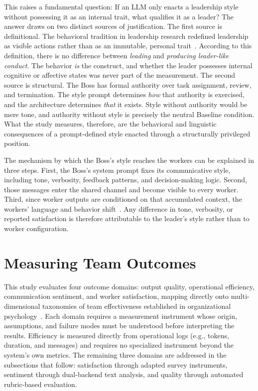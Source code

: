 This raises a fundamental question: 
If an \ac{LLM} only enacts a leadership style without possessing it as an internal trait, what qualifies it as a leader?
The answer draws on two distinct sources of justification.
The first source is definitional.
The behavioral tradition in leadership research redefined leadership as visible actions rather than as an immutable, personal trait~\cite{lewin1939patterns, judge2002personality, mathieu2017teamwork}.
According to this definition, there is no difference between \emph{leading} and \emph{producing leader-like conduct}.
The behavior \textit{is} the construct, and whether the leader possesses internal cognitive or affective states was never part of the measurement.
The second source is structural.
The Boss has formal authority over task assignment, review, and termination.
The style prompt determines \textit{how} that authority is exercised, and the architecture determines \textit{that} it exists.
Style without authority would be mere tone, and authority without style is precisely the neutral Baseline condition.
What the study measures, therefore, are the behavioral and linguistic consequences of a prompt-defined style enacted through a structurally privileged position.

The mechanism by which the Boss's style reaches the workers can be explained in three steps.
First, the Boss's system prompt fixes its communicative style, including tone, verbosity, feedback patterns, and decision-making logic.
Second, those messages enter the shared channel and become visible to every worker.
Third, since worker outputs are conditioned on that accumulated context, the workers' language and behavior shift~\cite{shanahan2023roleplaylargelanguagemodels, lin2025simulatingsocialinfluencedynamics}.
Any difference in tone, verbosity, or reported satisfaction is therefore attributable to the leader's style rather than to worker configuration.

\section{Measuring Team Outcomes}
\label{sec:measuring-outcomes}

This study evaluates four outcome domains: output quality, operational efficiency, communication sentiment, and worker satisfaction, mapping directly onto multi-dimensional taxonomies of team effectiveness established in organizational psychology~\cite{mathieu2017teamwork, wageman2005teamdiagnosticsurvey}.
Each domain requires a measurement instrument whose origin, assumptions, and failure modes must be understood before interpreting the results.
Efficiency is measured directly from operational logs (e.g., tokens, duration, and messages) and requires no specialized instrument beyond the system's own metrics.
The remaining three domains are addressed in the subsections that follow: satisfaction through adapted survey instruments, sentiment through dual-backend text analysis, and quality through automated rubric-based evaluation.

